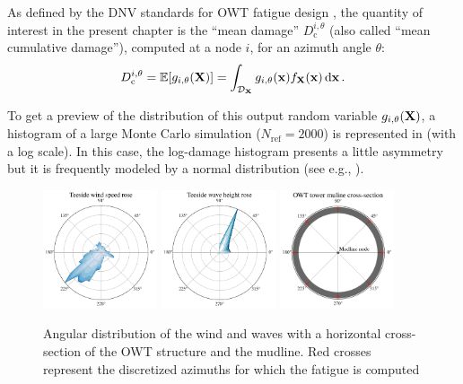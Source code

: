 As defined by the DNV standards for OWT fatigue design \citep{dnv_fatigue_2016}, the quantity of interest in the present chapter is the ``mean damage'' $D_{\mathrm{c}}^{i, \theta}$ (also called ``mean cumulative damage''), computed at a node $i$, for an azimuth angle $\theta$:
\begin{equation}
    D_{\mathrm{c}}^{i, \theta} = \mathbb{E}[g_{i, \theta}({\bf X})] = \int_{\mathcal{D}_{\bf X}} g_{i, \theta}({\bf x}) f_{{\bf X}}({\bf x})\, \mathrm{d} {\bf x} \,.
    \label{eq:mean_integral}
\end{equation}

To get a preview of the distribution of this output random variable $g_{i, \theta}({\bf X})$, a histogram of a large Monte Carlo simulation ($N_{\mathrm{ref}}=2000$) is represented in  (with a log scale). 
In this case, the log-damage histogram presents a little asymmetry but it is frequently modeled by a normal distribution (see e.g., \citet{teixeira_2019}). 

\begin{figure}[!h]
\begin{center}
    \includegraphics[width=0.3\textwidth]{part2/figures/DCE/teesside/teeside_wind_rose.pdf} \quad
    \includegraphics[width=0.3\textwidth]{part2/figures/DCE/teesside/teeside_wave_rose.pdf} \quad
    \includegraphics[width=0.3\textwidth]{part2/figures/DCE/teesside/mudline_crossection.pdf}
\end{center}
\caption{Angular distribution of the wind and waves with a horizontal cross-section of the OWT structure and the mudline. 
Red crosses represent the discretized azimuths for which the fatigue is computed}
\label{fig:wind_wave_roses}
\end{figure}

